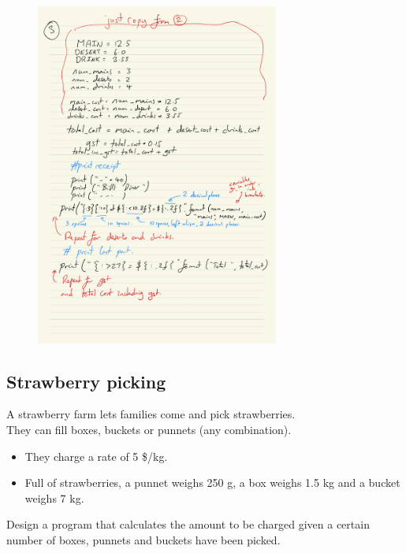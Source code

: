 \documentclass[a4paper,12pt]{article}
\begin{document}
\begin{figure} [!h]
	\centering
	\includegraphics[width=8cm]{iterative_processes/Components_detailed_p3.pdf}
\end{figure}

\newpage




\newpage
\subsection{Strawberry picking}

A strawberry farm lets families come and pick strawberries. \\
They can fill boxes, buckets or punnets (any combination).\\
\begin{itemize}
	\item They charge a rate of 5 \$/kg. 
	\item Full of strawberries, a punnet weighs 250 g, a box weighs 1.5 kg and a bucket weighs 7 kg.
\end{itemize}
Design a program that calculates the amount to be charged given a certain number of boxes, punnets and buckets have been picked.
\end{document}

